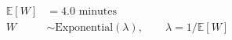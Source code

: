 \begin{align}
  \mathbb{E}[W] &= 4.0 \text{ minutes} \\
  W &\sim \mathrm{Exponential}(\lambda), \qquad \lambda = 1/\mathbb{E}[W]
\end{align}
